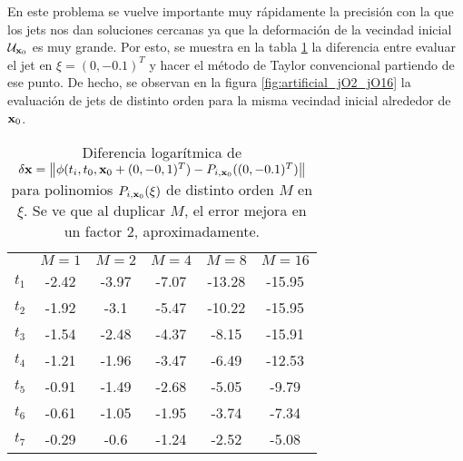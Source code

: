 En este problema se vuelve importante muy rápidamente la precisión con la que los jets nos dan soluciones cercanas ya que la deformación de la vecindad inicial $\mathcal{U}_{\mathbf{x}_0}$ es muy grande. Por esto, se muestra en la tabla \ref{table:djet_artificial} la diferencia entre evaluar el jet en $\xi = (0,-0.1)^T$ y hacer el método de Taylor convencional partiendo de ese punto. De hecho, se observan en la figura \ref{fig:artificial_jO2_jO16} la evaluación de jets de distinto orden para la misma vecindad inicial alrededor de $\mathbf{x}_0$.

\begin{table}[h!]
\centering
\begin{tabular}{c|ccccc}
\toprule
               & \textbf{$ M = 1 $} & \textbf{$M = 2 $} & \textbf{$ M = 4$} & \textbf{$ M = 8 $} & \textbf{$ M = 16 $} \\ \cmidrule(l){1-6} 
\textbf{$t_1$} & -2.42                      & -3.97                      & -7.07                      & -13.28                     & -15.95                        \\
\textbf{$t_2$} & -1.92                      & -3.1                       & -5.47                      & -10.22                     & -15.95                        \\
\textbf{$t_3$} & -1.54                      & -2.48                      & -4.37                      & -8.15                      & -15.91                        \\
\textbf{$t_4$} & -1.21                      & -1.96                      & -3.47                      & -6.49                      & -12.53                        \\
\textbf{$t_5$} & -0.91                      & -1.49                      & -2.68                      & -5.05                      & -9.79                         \\
\textbf{$t_6$} & -0.61                      & -1.05                      & -1.95                      & -3.74                      & -7.34                         \\
\textbf{$t_7$} & -0.29                      & -0.6                       & -1.24                      & -2.52                      & -5.08                         \\ \bottomrule 
\end{tabular}
\caption{Diferencia logarítmica de $\delta \mathbf{x} = \left\lVert \phi(t_i,t_0,\mathbf{x}_0 + (0,-0,1)^T) - P_{i,\mathbf{x}_0}((0,-0.1)^T) \right\rVert$ para polinomios $P_{i,\mathbf{x}_0}(\xi)$ de distinto orden $M$ en $\xi$. Se ve que al duplicar $M$, el error mejora en un factor $2$, aproximadamente.}
\label{table:djet_artificial}
\end{table}

